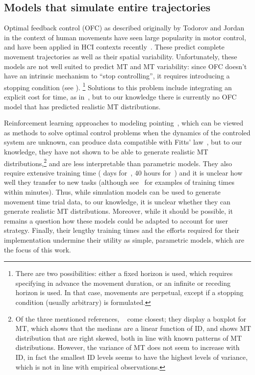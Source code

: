 \documentclass[acmlarge, manuscript,review]{acmart}
\begin{document}
\subsection{Models that simulate entire trajectories\label{rw:simulators}}
Optimal feedback control (OFC) as described originally by Todorov and Jordan~\cite{todorov2002} in the context of human movements have seen large popularity in motor control, and have been applied in HCI contexts recently~\cite{klar2023,fischer2022}. These predict complete movement trajectories as well as their spatial variability.
Unfortunately, these models are not well suited to predict MT and MT variability: since OFC doesn't have an intrinsic mechanism to ``stop controlling'', it requires introducing a stopping condition (see \eg \cite[Section 3.4]{qian2013}). \footnote{There are two possibilities: either a fixed horizon is used, which requires specifying in advance the movement duration, or an infinite or receding horizon is used. In that case, movements are perpetual, except if a stopping condition (usually arbitrary) is formulated.}
Solutions to this problem include integrating an explicit cost for time, as in~\cite{berret2016}, but to our knowledge there is currently no OFC model that has predicted realistic MT distributions.

\smallskip

Reinforcement learning approaches to modeling pointing~\cite{ikkala2022, charaja2024, fischer2021,do2021,moon2024}, which can be viewed as methods to solve optimal control problems when the dynamics of the controled system are unknown, can produce data compatible with Fitts' law~\cite{ikkala2022, charaja2024, fischer2021}, but to our knowledge, they have not shown to be able to generate realistic MT distributions,\footnote{Of the three mentioned references, \citeauthor{fischer2021}~\cite{fischer2021} come closest; they display a boxplot for MT, which shows that the medians are a linear function of ID, and shows MT distribution that are right skewed, both in line with known patterns of MT distributions. However, the variance of MT does not seem to increase with ID, in fact the smallest ID levels seems to have the highest levels of variance, which is not in line with empirical observations.} and are less interpretable than parametric models. They also require extensive training time ( days for~\cite{do2021}, 40 hours for~\cite{moon2024}) and it is unclear how well they transfer to new tasks (although see~\cite{moon2024, bhattarai2026} for examples of training times within minutes).
Thus, while simulation models can be used to generate movement time trial data, to our knowledge, it is unclear whether they can generate realistic MT distributions. Moreover, while it should be possible, it remains a question how these models could be adapted to account for user strategy. Finally, their lengthy training times and the efforts required for their implementation undermine their utility as simple, parametric models, which are the focus of this work.
\end{document}
